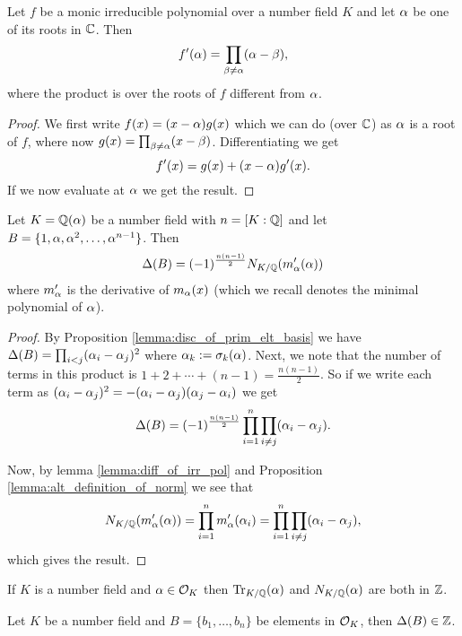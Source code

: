 \begin{lemma}\label{lemma:diff_of_irr_pol}
    \leanok
	Let $f$ be a monic irreducible polynomial over a number field $K$ and let $\alpha$ be one of its roots in $\mathbb{C}$. Then \[f'(\alpha)=\prod_{\beta \neq \alpha} (\alpha-\beta),  \] where the product is over the roots of $f$ different from $\alpha$.
\end{lemma}
\begin{proof}
    \leanok
	We first write $f(x)=(x-\alpha)g(x)$ which we can do (over $\mathbb{C}$) as $\alpha$ is a root of $f$, where now $g(x)=\prod_{\beta \neq \alpha} (x-\beta)$. Differentiating we get \[f'(x)=g(x)+(x-\alpha)g'(x).\] If we now evaluate at $\alpha$ we get the result.
\end{proof}

\begin{lemma}\label{lemma:num_field_disc_in_terms_of_norm}
	\leanok
	Let $K=\mathbb{Q}(\alpha)$ be a number field with $n=[K:\mathbb{Q}]$ and let $B=\{1,\alpha,\alpha^2,\dots,\alpha^{n-1}\}$. Then \[\Delta(B)=(-1)^{\frac{n(n-1)}{2}}N_{K/\mathbb{Q}}(m_\alpha'(\alpha))\] where $m_\alpha'$ is the derivative of $m_\alpha(x)$ (which we recall denotes the minimal polynomial of $\alpha$).
\end{lemma}
\begin{proof}
    \leanok
	By Proposition \ref{lemma:disc_of_prim_elt_basis} we have $\Delta(B)=\prod_{i < j}(\alpha_i-\alpha_j)^2$ where $\alpha_k:=\sigma_k(\alpha)$. Next, we note that the number of terms in this product is $1+2+\cdots+(n-1)=\frac{n(n-1)}{2}$. So if we write each term as $(\alpha_i-\alpha_j)^2=-(\alpha_i-\alpha_j)(\alpha_j-\alpha_i)$ we get \[\Delta(B)=(-1)^{\frac{n(n-1)}{2}}\prod_{i=1}^n \prod_{i \neq j} (\alpha_i-\alpha_j). \]

	Now, by lemma \ref{lemma:diff_of_irr_pol} and Proposition \ref{lemma:alt_definition_of_norm} we see that \[N_{K/\mathbb{Q}}(m_\alpha'(\alpha))=\prod_{i=1}^n m_\alpha'(\alpha_i)=\prod_{i=1}^n \prod_{i \neq j} (\alpha_i-\alpha_j),\] which gives the result.
\end{proof}

\begin{lemma}\label{lemma:norm_trace_of_alg_int_is_int}
	If $K$ is a number field and $\alpha \in \mathcal{O}_K$ then $\operatorname{Tr}_{K/\mathbb{Q}}(\alpha)$ and $N_{K/\mathbb{Q}}(\alpha)$ are both in $\mathbb{Z}$.
\end{lemma}

\begin{lemma}\label{lemma:int_basis_int_disc}
	Let $K$ be a number field and $B=\{b_1,\dots,b_n\}$ be elements in $\mathcal{O}_K$, then $\Delta(B) \in \mathbb{Z}$.
\end{lemma}

